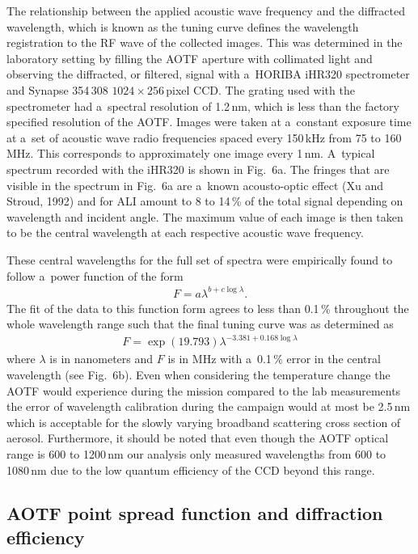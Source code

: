 \documentclass[amtd, online, hvmath]{copernicus}
\begin{document}
The relationship between the applied acoustic wave frequency and the
diffracted wavelength, which is known as the tuning curve defines the
wavelength registration to the RF wave of the collected images. This
was determined in the laboratory setting by filling the AOTF aperture
with collimated light and observing the diffracted, or filtered,
signal with a~HORIBA iHR320 spectrometer and Synapse 354\,308
$1024\times 256$\,pixel CCD. The grating used with the spectrometer
had a~spectral resolution of 1.2\,\unit{nm}, which is less than
the factory specified resolution of the AOTF. Images were taken at
a~constant exposure time at a~set of acoustic wave radio frequencies
spaced every 150\,\unit{kHz} from 75 to 160\,\unit{MHz}. This
corresponds to approximately one image every 1\,\unit{nm}. A~typical
spectrum recorded with the iHR320 is shown in Fig.~6a. The fringes
that are visible in the spectrum in Fig.~6a are a~known acousto-optic
effect (Xu and Stroud, 1992) and for ALI amount to 8 to 14\,{\%} of
the total signal depending on wavelength and incident angle. The
maximum value of each image is then taken to be the central wavelength
at each respective acoustic wave frequency.

These central wavelengths for the full set of spectra were empirically
found to follow a~power function of the form
\begin{align}
F=a\lambda^{b+c\log \lambda}.
\end{align}
The fit of the data to this function form agrees to less than
0.1\,{\%} throughout the whole wavelength range such that the final
tuning curve was as determined as
\begin{align}
F=\exp \left(19.793 \right)\lambda^{-3.381+0.168\log \lambda}
\end{align}
where $\lambda$ is in nanometers and $F$ is in MHz with a~0.1\,{\%}
error in the central wavelength (see Fig.~6b). Even when considering the temperature change the AOTF would experience during the mission compared to the lab measurements the error of wavelength calibration during the campaign would at most be 2.5\,nm which is acceptable for the slowly varying broadband scattering cross section of aerosol. Furthermore, it should be noted that
even though the AOTF optical range is 600 to 1200\,\unit{nm} our
analysis only measured wavelengths from 600 to 1080\,\unit{nm} due to
the low quantum efficiency of the CCD beyond this range.

\subsection{AOTF point spread function and diffraction efficiency}
\end{document}
